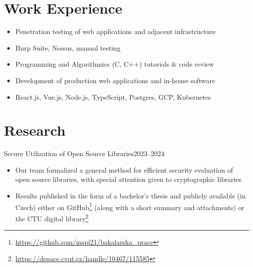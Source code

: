\documentclass{customcv}
\begin{document}

\section{Work Experience}
    \begin{itemize}
        \item Penetration testing of web applications and adjacent infrastructure
        
        \item Burp Suite, Nessus, manual testing
    \end{itemize}

    \begin{itemize}
        \item Programming and Algorithmics (C, C++) tutorials \& code review
    \end{itemize}

    \begin{itemize}
        \item Development of production web applications and in-house software
        
        \item React.js, Vue.js, Node.js, TypeScript, Postgres, GCP, Kubernetes
    \end{itemize}

\section{Research}
        {Secure Utilization of Open Source Libraries}{2023--2024}
    \begin{itemize}
        \item Our team formalized a general method for efficient security evaluation of open source libraries,
        with special attention given to cryptographic libraries
        
        \item Results published in the form of a bachelor’s thesis and publicly available (in Czech) either
        on GitHub\footnote{\url{https://github.com/mspi21/bakalarska_prace}} (along with a short summary and
        attachments) or the CTU digital library\footnote{\url{https://dspace.cvut.cz/handle/10467/115585}}
    \end{itemize}
\end{document}
